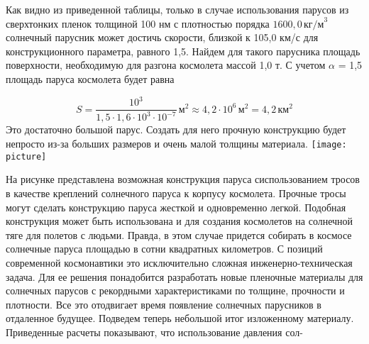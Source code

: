 \begin{multicols}{2}
Как видно из приведенной таблицы, только в случае использования парусов из сверхтонких пленок толщиной 100 нм с плотностью порядка $1600,0\, \text{кг/м}^3$ солнечный парусник может достичь скорости, близкой к 105,0 км/с для конструкционного параметра, равного 1,5. Найдем для такого парусника площадь поверхности, необходимую для разгона космолета массой 1,0 т. С учетом $\alpha$ = 1,5 площадь паруса космолета будет равна

\[S=\frac{10^3}{1,5\cdot 1,6\cdot 10^3\cdot 10^{-7}}\, \text{м}^2\approx 4,2\cdot 10^6\, \text{м}^2=4,2\, \text{км}^2\]
Это достаточно большой парус. Создать для него прочную конструкцию будет непросто из-за больших размеров и очень малой толщины материала.
\texttt{[image: picture]}


На рисунке представлена возможная конструкция паруса сиспользованием тросов в качестве креплений солнечного паруса к корпусу космолета. Прочные тросы могут сделать конструкцию паруса жесткой и одновременно легкой. Подобная конструкция может быть использована и для создания космолетов на солнечной тяге для полетов с людьми. Правда, в этом случае придется собирать в космосе солнечные паруса площадью в сотни квадратных километров. С позиций современной космонавтики это исключительно сложная инженерно-техническая задача. Для ее решения понадобится разработать новые пленочные материалы для солнечных парусов с рекордными характеристиками по толщине, прочности и плотности. Все это отодвигает время появление солнечных парусников в отдаленное будущее. Подведем теперь небольшой итог изложенному материалу. Приведенные расчеты показывают, что использование давления сол-
\end{multicols}


